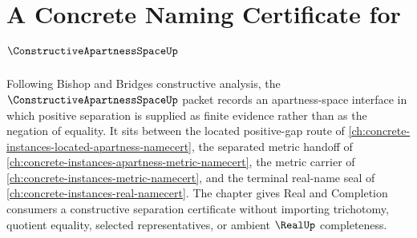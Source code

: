 \chapter{A Concrete Naming Certificate for $\ConstructiveApartnessSpaceUp$}
\label{ch:concrete-instances-constructive-apartness-space-namecert}

Following Bishop and Bridges constructive analysis, the $\ConstructiveApartnessSpaceUp$ packet records an apartness-space interface in which positive separation is supplied as finite evidence rather than as the negation of equality. It sits between the located positive-gap route of \autoref{ch:concrete-instances-located-apartness-namecert}, the separated metric handoff of \autoref{ch:concrete-instances-apartness-metric-namecert}, the metric carrier of \autoref{ch:concrete-instances-metric-namecert}, and the terminal real-name seal of \autoref{ch:concrete-instances-real-namecert}. The chapter gives Real and Completion consumers a constructive separation certificate without importing trichotomy, quotient equality, selected representatives, or ambient $\RealUp$ completeness.

